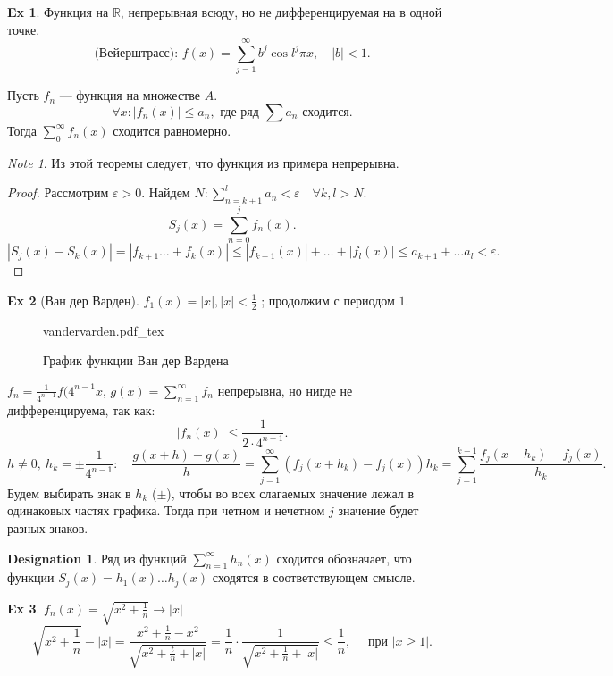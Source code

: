 \documentclass[11pt]{book}
\newcommand{\incfig}[1]{%
    \def\svgwidth{\columnwidth}
    {#1.pdf_tex}
}
\newcommand{\R}{\mathbb{R}}
\newcommand{\slim}{\sum\limits}
\renewcommand{\le}{\leqslant}
\renewcommand{\ge}{\geqslant}
\theoremstyle{definition}
\theoremstyle{plain}
\theoremstyle{plain}
\theoremstyle{definition}
\newtheorem*{ex}{Ex}
\newtheorem*{name}{Designation}
\theoremstyle{remark}
\newtheorem*{note}{Note}
\begin{document}
\begin{ex}
    Функция на $\R$, непрерывная всюду, но не дифференцируемая на в одной точке.
    \[
	\text{(Вейерштрасс): } f(x) = \slim_{j=1}^{\infty} b^{ j} \cos l^{j} \pi x, \quad |b| < 1
    .\]
\end{ex}
\begin{thm}[Вейерштрасс]
    Пусть $f_n$ --- функция на множестве $A$.
    \[
	\forall  x : |f_n(x)| \le a_n, \text{ где ряд } \slim a_n \text{ сходится}
    .\]
    Тогда $\slim_0^{\infty} f_n(x) $ сходится равномерно.
\end{thm}
\begin{note}
    Из этой теоремы следует, что функция из примера непрерывна.
\end{note}
\begin{proof}
    Рассмотрим $ \varepsilon  > 0$. Найдем $N: \slim_{n=k+1}^{l} a_n < \varepsilon  \quad \forall  k, l > N$.
    \[
	S_j(x) = \slim_{n=0}^{j}f_n(x)
    .\]
    \[
	|S_j(x) - S_k(x)| = | f_{k+1} \ldots + f_k(x)| \le  |f_{k+1}(x)| + \ldots  + |f_l(x)| \le a_{k+1} + \ldots a_l < \varepsilon
    .\]
\end{proof}
\begin{ex}[Ван дер Варден]
    $f_1(x) =
    |x|,  |x| < \frac{1}{2} $ ; продолжим с периодом $1$.
    \begin{figure}[h]
	\centering
	\incfig{vandervarden}
	\caption{График функции Ван дер Вардена}
	\label{fig:vandervarden}
    \end{figure}
    $f_n = \frac{1}{4^{n-1}}f(4^{n-1}x$, $g(x) = \slim_{n=1}^{\infty} f_n$ непрерывна, но нигде не дифференцируема, так как:
    \[
	|f_n(x) | \le \frac{1}{2 \cdot 4^{n-1}}
    .\]
    \[
	h \ne 0, ~ h_k = \pm \frac{1}{4^{n-1}}: \quad \frac{g(x + h) - g(x)}{h} = \slim_{j=1}^{\infty} (f_j(x + h_k) - f_j(x))h_k = \slim_{j=1}^{k-1} \frac{f_j(x + h_k) - f_j(x)}{h_k}
    .\]
    Будем выбирать знак  в $h_k$ ($\pm$), чтобы во всех слагаемых значение лежал в одинаковых частях графика. Тогда при четном и нечетном $j$ значение будет разных знаков.
\end{ex}
\begin{name}
    Ряд из функций $\slim_{n=1}^{\infty} h_n(x)$ сходится обозначает, что функции $S_j(x) = h_1(x) \ldots  h_j(x)$  сходятся в соответствующем смысле.
\end{name}
\begin{ex}
    $f_n(x) = \sqrt{x^2 + \frac{1}{n}} \to  |x|$
    \[
	\sqrt{x^2 + \frac{1}{n} }- |x| = \frac{x^2 + \frac{1}{n}  - x^2}{\sqrt{x^2 + \frac{t}{n} + |x|}} = \frac{1}{n }\cdot \frac{1}{\sqrt{x ^2 + \frac{1}{n} + |x|}} \le  \frac{1}{n}, \quad \text{ при } |x \ge  1|
    .\]
\end{ex}
\end{document}
